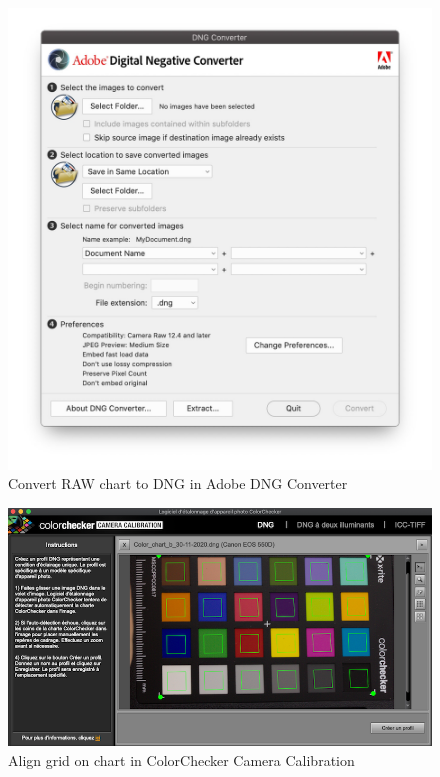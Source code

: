 \documentclass[
]{book}
\begin{document}
\begin{figure}

{\centering \includegraphics[width=0.8\linewidth]{Figures/DNGConverter} 

}

\caption{Convert RAW chart to DNG in Adobe DNG Converter}\label{fig:DNG}
\end{figure}

\begin{figure}

{\centering \includegraphics[width=0.8\linewidth]{Figures/ColorChecker_camera_calibration} 

}

\caption{Align grid on chart in ColorChecker Camera Calibration}\label{fig:Colorcheckercalibration}
\end{figure}
\end{document}
